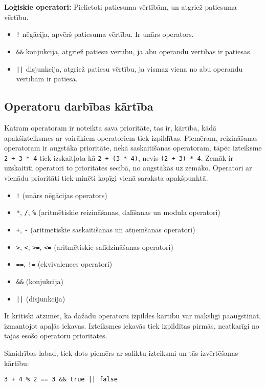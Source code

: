 \documentclass[12pt,a4paper]{report}
\begin{document}
\textbf{Loģiskie operatori:} Pielietoti patiesuma vērtībām, un atgriež patiesuma vērtību.
\begin{itemize}
  \item \texttt{!} nēgācija, apvērš patiesuma vērtību. Ir unārs operators. 
  \item \texttt{\&\&} konjukcija, atgriež patiesu vērtību, ja abu operandu vērtības ir patiesas
  \item \texttt{||} disjunkcija, atgriež patiesu vērtību, ja vismaz viena no abu operandu vērtībām ir patiesa.
\end{itemize}

\subsection{Operatoru darbības kārtība}

Katram operatoram ir noteikta sava prioritāte, tas ir, kārtība, kādā apakšizteiksmes ar vairākiem operatoriem tiek izpildītas. Piemēram, reizināšanas operatoram ir augstāka prioritāte, nekā saskaitīšanas operatoram, tāpēc izteiksme \texttt{2 + 3 * 4} tiek izskaitļota kā \texttt{2 + (3 * 4)}, nevis \texttt{(2 + 3) * 4}. 
Zemāk ir uzskaitīti operatori to prioritātes secībā, no augstākās uz zemāko. Operatori ar vienādu prioritāti tiek minēti kopīgi vienā saraksta apakšpunktā.

\begin{itemize}
  \item \texttt{!} (unārs nēgācijas operators)
  \item \texttt{*}, \texttt{/}, \texttt{\%} (aritmētiskie reizināšanas, dalīšanas un modula operatori)
  \item \texttt{+}, \texttt{-} (aritmētiskie saskaitīšanas un atņemšanas operatori)
  \item \texttt{>}, \texttt{<}, \texttt{>=}, \texttt{<=} (aritmētiskie salīdzināšanas operatori)
  \item \texttt{==}, \texttt{!=} (ekvivalences operatori)
  \item \texttt{\&\&} (konjukcija)
  \item \texttt{||} (disjunkcija) 
\end{itemize}

Ir kritiski atzīmēt, ka dažādu operatoru izpildes kārtību var mākslīgi paaugstināt, izmantojot apaļās iekavas. Izteiksmes iekavās tiek izpildītas pirmās, neatkarīgi no tajās esošo operatoru prioritātes.

Skaidrības labad, tiek dots piemērs ar saliktu izteiksmi un tās izvērtēšanas kārtību:
\begin{verbatim}
3 + 4 % 2 == 3 && true || false
\end{verbatim}
\end{document}
